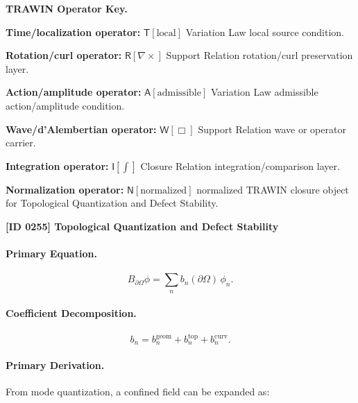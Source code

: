 \par\vspace{0.45\baselineskip}
\noindent\begin{minipage}[t]{\linewidth}
\begingroup
\small
\raggedright
\textbf{TRAWIN Operator Key.}\par
\noindent\textbf{Time/localization operator:} $\mathsf{T}\!\left[\mathrm{local}\right]$ Variation Law local source condition.\par
\noindent\textbf{Rotation/curl operator:} $\mathsf{R}\!\left[\nabla\times\right]$ Support Relation rotation/curl preservation layer.\par
\noindent\textbf{Action/amplitude operator:} $\mathsf{A}\!\left[\mathrm{admissible}\right]$ Variation Law admissible action/amplitude condition.\par
\noindent\textbf{Wave/d'Alembertian operator:} $\mathsf{W}\!\left[\Box\right]$ Support Relation wave or operator carrier.\par
\noindent\textbf{Integration operator:} $\mathsf{I}\!\left[\int\right]$ Closure Relation integration/comparison layer.\par
\noindent\textbf{Normalization operator:} $\mathsf{N}\!\left[\mathrm{normalized}\right]$ normalized TRAWIN closure object for Topological Quantization and Defect Stability.\par
\endgroup
\end{minipage}

\clearpage
\noindent\textbf{[ID 0255] Topological Quantization and Defect Stability}\par
\vspace{0.35em}
\paragraph{Primary Equation.}
\begin{equation}
B_{\partial\Omega}\phi
=
\sum_n b_n(\partial\Omega)\,\phi_n .
\end{equation}

\paragraph{Coefficient Decomposition.}
\begin{equation}
b_n
=
b_n^{\mathrm{geom}}
+
b_n^{\mathrm{top}}
+
b_n^{\mathrm{curv}} .
\end{equation}

\paragraph{Primary Derivation.}
From mode quantization, a confined field can be expanded as:

